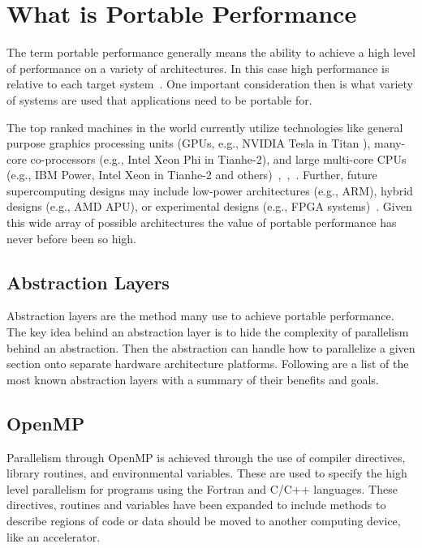 \section{\textbf{What is Portable Performance}}

The term portable performance generally means the ability to achieve a high level of performance on a variety of architectures.
%
In this case high performance is relative to each target system~\cite{michaelwolfe2016}.
%
One important consideration then is what variety of systems are used that applications need to be portable for. 
%

%
The top ranked machines in the world currently utilize technologies like general purpose graphics processing units (GPUs, e.g., NVIDIA Tesla in Titan ), many-core co-processors (e.g., Intel Xeon Phi in Tianhe-2), and large multi-core CPUs (e.g., IBM Power, Intel Xeon in Tianhe-2 and others)~\cite{michaelwolfe2016},~\cite{top500thelist2016},~\cite{hankchilds2015}. 
%
Further, future supercomputing designs may include low-power architectures (e.g., ARM), hybrid designs (e.g., AMD APU), or experimental designs (e.g., FPGA systems)~\cite{hankchilds2015}. 
%
Given this wide array of possible architectures the value of portable performance has never before been so high.
%

\subsection{ \textbf{Abstraction Layers}}

Abstraction layers are the method many use to achieve portable performance.
%
The key idea behind an abstraction layer is to hide the complexity of parallelism behind an abstraction.
%
Then the abstraction can handle how to parallelize a given section onto separate hardware architecture platforms.
%
Following are a list of the most known abstraction layers with a summary of their benefits and goals.

\subsection*{\textbf{OpenMP}}

Parallelism through OpenMP is achieved through the use of compiler directives, library routines, and environmental variables.
%
These are used to specify the high level parallelism for programs using the Fortran and C/C++ languages.
%
These directives, routines and variables have been expanded to include methods to describe regions of code or data should be moved to another computing device, like an accelerator.~\cite{openmp}

